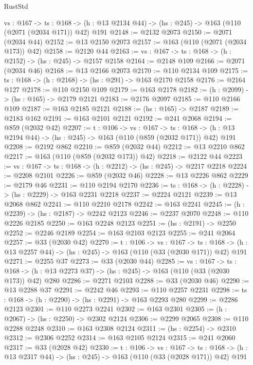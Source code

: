 \begin{lexlean}{RustStd}
\begin{coremodule}
{\begin{coremodule}
{{{  {vs : @167} ->
  {ts : @168} -> (h : @13 @2134 @44) -> (hs : @245) -> @163 (@110 (@2071 (@2034 @171)) @42) @191
@2148 := @2132 @2073
@2150 := @2071 (@2034 @44)
@2152 := @13 @2150 @2073
@2157 := @163 (@110 (@2071 (@2034 @173)) @42)
@2158 := @2120 @44
@2163 := {vs : @167} -> {ts : @168} -> (h : @2152) -> (hs : @245) -> @2157 @2158
@2164 := @2148 @109
@2166 := @2071 (@2034 @46)
@2168 := @13 @2166 @2073
@2170 := @110 @2134 @109
@2175 := {ts : @168} -> (h : @2168) -> (hs : @291) -> @163 @2170 @2158
@2176 := @2164 @127
@2178 := @110 @2150 @109
@2179 := @163 @2178
@2182 := (h : @2099) -> (hs : @165) -> @2179 @2121
@2183 := @2176 @2097
@2185 := @110 @2166 @109
@2187 := @163 @2185 @2121
@2188 := (hs : @165) -> @2187
@2189 := @2183 @162
@2191 := @163 @2101 @2121
@2192 := @241 @2068
@2194 := @859 (@2032 @42)
@2207 := {t : @106} ->
  {vs : @167} ->
  {ts : @168} -> (h : @13 @2194 @44) -> (hs : @245) -> @163 (@110 (@859 (@2032 @171)) @42) @191
@2208 := @2192 @862
@2210 := @859 (@2032 @44)
@2212 := @13 @2210 @862
@2217 := @163 (@110 (@859 (@2032 @173)) @42)
@2218 := @2122 @44
@2223 := {vs : @167} -> {ts : @168} -> (h : @2212) -> (hs : @245) -> @2217 @2218
@2224 := @2208 @2101
@2226 := @859 (@2032 @46)
@2228 := @13 @2226 @862
@2229 := @2179 @46
@2231 := @110 @2194 @2170
@2236 := {ts : @168} -> (h : @2228) -> (hs : @2229) -> @163 @2231 @2218
@2237 := @2224 @2121
@2239 := @13 @2068 @862
@2241 := @110 @2210 @2178
@2242 := @163 @2241
@2245 := (h : @2239) -> (hs : @2187) -> @2242 @2123
@2246 := @2237 @2070
@2248 := @110 @2226 @2185
@2250 := @163 @2248 @2123
@2251 := (hs : @2191) -> @2250
@2252 := @2246 @2189
@2254 := @163 @2103 @2123
@2255 := @241 @2064
@2257 := @33 (@2030 @42)
@2270 := {t : @106} ->
  {vs : @167} ->
  {ts : @168} -> (h : @13 @2257 @44) -> (hs : @245) -> @163 (@110 (@33 (@2030 @171)) @42) @191
@2271 := @2255 @37
@2273 := @33 (@2030 @44)
@2285 := {vs : @167} ->
  {ts : @168} -> (h : @13 @2273 @37) -> (hs : @245) -> @163 (@110 (@33 (@2030 @173)) @42) @280
@2286 := @2271 @2103
@2288 := @33 (@2030 @46)
@2290 := @13 @2288 @37
@2291 := @2242 @46
@2293 := @110 @2257 @2231
@2298 := {ts : @168} -> (h : @2290) -> (hs : @2291) -> @163 @2293 @280
@2299 := @2286 @2123
@2301 := @110 @2273 @2241
@2302 := @163 @2301
@2305 := (h : @2067) -> (hs : @2250) -> @2302 @2124
@2306 := @2299 @2065
@2308 := @110 @2288 @2248
@2310 := @163 @2308 @2124
@2311 := (hs : @2254) -> @2310
@2312 := @2306 @2252
@2314 := @163 @2105 @2124
@2315 := @241 @2060
@2317 := @33 (@2028 @42)
@2330 := {t : @106} ->
  {vs : @167} ->
  {ts : @168} -> (h : @13 @2317 @44) -> (hs : @245) -> @163 (@110 (@33 (@2028 @171)) @42) @191
}}}
\end{coremodule}}
\end{coremodule}
\end{lexlean}
